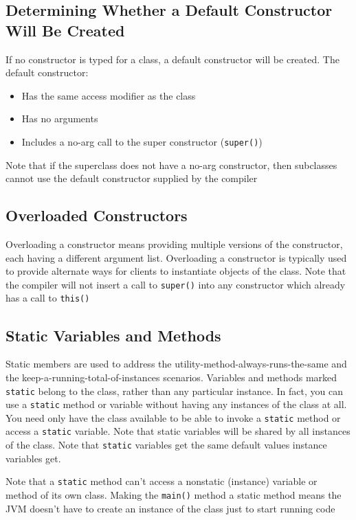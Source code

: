 \subsection{Determining Whether a Default Constructor Will Be Created}
If no constructor is typed for a class, a default constructor will be created.  
The default constructor:
\begin{itemize}
    \item Has the same access modifier as the class
    \item Has no arguments
    \item Includes a no-arg call to the super constructor (\verb#super()#)
\end{itemize}
Note that if the superclass does not have a no-arg constructor, then subclasses 
cannot use the default constructor supplied by the compiler

\subsection{Overloaded Constructors}
Overloading a constructor means providing multiple versions of the constructor, 
each having a different argument list. Overloading a constructor is typically 
used to provide alternate ways for clients to instantiate objects of the class.  
Note that the compiler will not insert a call to \verb#super()# into any 
constructor which already has a call to \verb#this()#

\subsection{Static Variables and Methods}
Static members are used to address the utility-method-always-runs-the-same and 
the keep-a-running-total-of-instances scenarios. Variables and methods marked 
\verb#static# belong to the class, rather than any particular instance. In 
fact, you can use a \verb#static# method or variable without having any 
instances of the class at all. You need only have the class available to be 
able to invoke a \verb#static# method or access a \verb#static# variable. Note 
that static variables will be shared by all instances of the class. Note that 
\verb#static# variables get the same default values instance variables get.

Note that a \verb#static# method can't access a nonstatic (instance) variable 
or method of its own class. Making the \verb#main()# method a static method 
means the JVM doesn't have to create an instance of the class just to start 
running code

